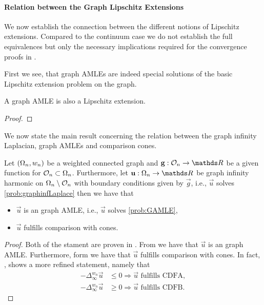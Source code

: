 \paragraph{Relation between the Graph Lipschitz Extensions}
We now establish the connection between the different notions of Lipschitz extensions. Compared to the continuum case we do not establish the full equivalences but only the necessary implications required for the convergence proofs in \cite{bungert2021uniform}.

First we see, that graph AMLEs are indeed special solutions of the basic Lipschitz extension problem on the graph.
%
\begin{lemma}{}{}
A graph AMLE is also a Lipschitz extension.
\end{lemma}
%
\begin{proof}

\end{proof}
%
%
We now state the main result concerning the relation between the graph infinity Laplacian, graph AMLEs and comparison cones.
%
%
\begin{lemma}{}{}
Let $(\Omega_n,w_n)$ be a weighted connected graph and $\vec g:\conset_n\to\R$ be a given function for $\mathcal{O}_n\subset\Omega_n$. Furthermore, let $\vec u:\domain_n\to\R$ be graph infinity harmonic on $\Omega_n\setminus\mathcal{O}_n$ with boundary conditions given by $\vec g$, i.e., $\vec u$ solves \cref{prob:graphinfLaplace} then we have that
%
\begin{itemize}
\item $\vec u$ is an graph AMLE, i.e., $\vec u$ solves \cref{prob:GAMLE},
\item $\vec u$ fulfills comparison with cones.
\end{itemize}
\end{lemma}
%
%
\begin{proof}
Both of the stament are proven in \cite{bungert2021uniform}. From \cite[Prop. 3.8]{bungert2021uniform} we have that $\vec u$ is an graph AMLE. Furthermore, form \cite[Th. 3.2]{bungert2021uniform} we have that $\vec u$ fulfills comparison with cones. In fact, \cite[Th. 3.2]{bungert2021uniform}, shows a more refined statement, namely that
%
\begin{align*}
-\Delta^{w_n}_\infty \vec u &\leq 0 \Rightarrow \vec u \text{ fulfills CDFA},\\
-\Delta^{w_n}_\infty \vec u &\geq 0 \Rightarrow \vec u \text{ fulfills CDFB}.
\end{align*}
%
\end{proof}
%
%
%
%
%
